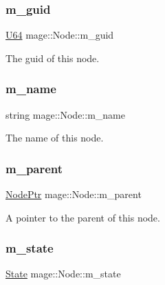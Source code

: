\subsubsection{\texorpdfstring{m\+\_\+guid}{m\_guid}}
{\footnotesize\ttfamily \mbox{\hyperlink{namespacemage_a6672cf3c861707ce4a3235a3eb43941d}{U64}} mage\+::\+Node\+::m\+\_\+guid\hspace{0.3cm}{\ttfamily [private]}}

The guid of this node. \mbox{\label{classmage_1_1_node_a476cc21fa65cdf9bde0f11fe08b5a707}} 
\subsubsection{\texorpdfstring{m\+\_\+name}{m\_name}}
{\footnotesize\ttfamily string mage\+::\+Node\+::m\+\_\+name\hspace{0.3cm}{\ttfamily [private]}}

The name of this node. \mbox{\label{classmage_1_1_node_aa04f166b52fca444c8756c0864a16cde}} 
\subsubsection{\texorpdfstring{m\+\_\+parent}{m\_parent}}
{\footnotesize\ttfamily \mbox{\hyperlink{classmage_1_1_node_ac575dc006e0ae1134277ade977dc06b6}{Node\+Ptr}} mage\+::\+Node\+::m\+\_\+parent\hspace{0.3cm}{\ttfamily [private]}}

A pointer to the parent of this node. \mbox{\label{classmage_1_1_node_a76b775e32bb001c54a9927461eaf7926}} 
\subsubsection{\texorpdfstring{m\+\_\+state}{m\_state}}
{\footnotesize\ttfamily \mbox{\hyperlink{namespacemage_ae47d13d8477ee94893b9a3947d28eebc}{State}} mage\+::\+Node\+::m\+\_\+state\hspace{0.3cm}{\ttfamily [private]}}

